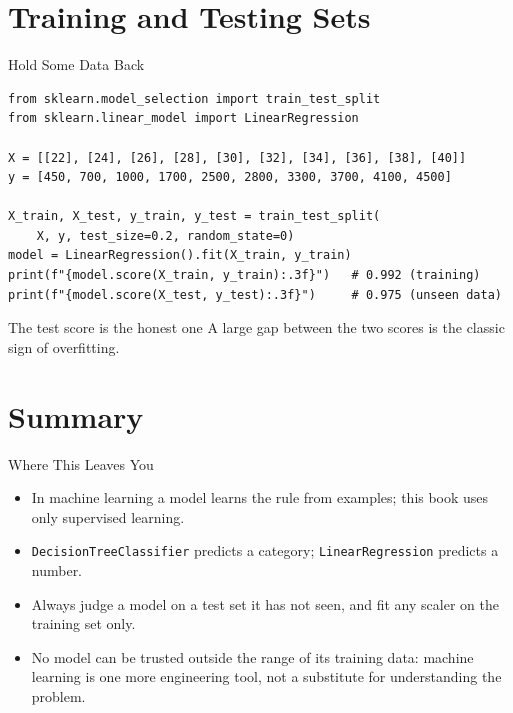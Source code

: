 \documentclass[9pt,aspectratio=169,xcolor=table]{beamer}
\begin{document}
\section{Training and Testing Sets}

\begin{frame}[fragile]{Hold Some Data Back}
    \leavevmode
\begin{lstlisting}
from sklearn.model_selection import train_test_split
from sklearn.linear_model import LinearRegression

X = [[22], [24], [26], [28], [30], [32], [34], [36], [38], [40]]
y = [450, 700, 1000, 1700, 2500, 2800, 3300, 3700, 4100, 4500]

X_train, X_test, y_train, y_test = train_test_split(
    X, y, test_size=0.2, random_state=0)
model = LinearRegression().fit(X_train, y_train)
print(f"{model.score(X_train, y_train):.3f}")   # 0.992 (training)
print(f"{model.score(X_test, y_test):.3f}")     # 0.975 (unseen data)
\end{lstlisting}

    \begin{block}{The test score is the honest one}
        \small A large gap between the two scores is the classic sign
        of \alert{overfitting}.
    \end{block}
\end{frame}

\section{Summary}

\begin{frame}{Where This Leaves You}
    \leavevmode
    \small
    \begin{itemize}
        \item In machine learning a model \alert{learns the rule} from
              examples; this book uses only supervised learning.
        \item \texttt{DecisionTreeClassifier} predicts a category;
              \texttt{LinearRegression} predicts a number.
        \item Always judge a model on a \alert{test set} it has not
              seen, and fit any scaler on the training set only.
        \item No model can be trusted outside the range of its training
              data: machine learning is \alert{one more engineering
              tool}, not a substitute for understanding the problem.
    \end{itemize}
\end{frame}
\end{document}
